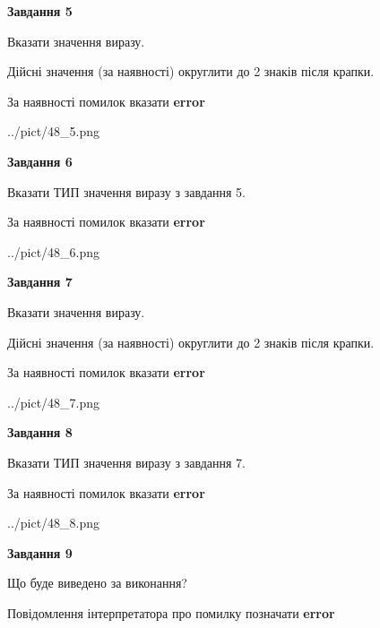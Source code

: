 \documentclass[11pt, ukrainian]{article}
\begin{document}
{\begin {large}
{\begin {center}\textbf{Завдання 5}\end {center}}\par
Вказати значення виразу. \par
Дійсні значення (за наявності) округлити до 2 знаків після крапки. \par
За наявності помилок вказати \textbf{error}

\begin{center}
	{../pict/48_5.png}
\end{center}
\newpage

{\begin {center}\textbf{Завдання 6}\end {center}}\par
Вказати ТИП значення виразу з завдання 5. \par
За наявності помилок вказати \textbf{error}

\begin{center}
	{../pict/48_6.png}
\end{center}
\newpage

{\begin {center}\textbf{Завдання 7}\end {center}}\par
Вказати значення виразу. \par
Дійсні значення (за наявності) округлити до 2 знаків після крапки. \par
За наявності помилок вказати \textbf{error}

\begin{center}
	{../pict/48_7.png}
\end{center}
\newpage

{\begin {center}\textbf{Завдання 8}\end {center}}\par
Вказати ТИП значення виразу з завдання 7. \par
За наявності помилок вказати \textbf{error}

\begin{center}
	{../pict/48_8.png}
\end{center}
\newpage

{\begin {center}\textbf{Завдання 9}\end {center}}\par
Що буде виведено за виконання? \par
Повідомлення інтерпретатора про помилку позначати \textbf{error}


\end{large}}
\end{document}
